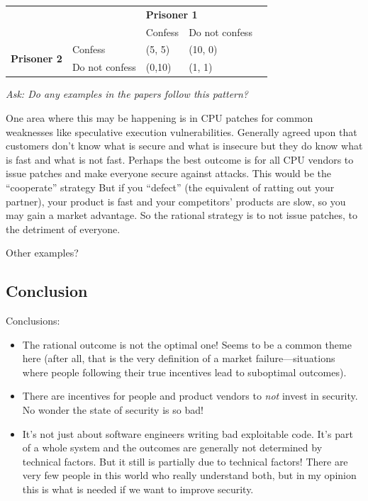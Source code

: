 \documentclass[11pt]{article}
\begin{document}
\begin{table}[]
    \centering
    \begin{tabular}{|ll|ll|l}
    \cline{1-4}
    \multicolumn{2}{|l|}{\multirow{2}{*}{}}                                     & \multicolumn{2}{l|}{\textbf{Prisoner 1}}      &  \\ \cline{3-4}
    \multicolumn{2}{|l|}{}                                                      & \multicolumn{1}{l|}{Confess} & Do not confess &  \\ \cline{1-4}
    \multicolumn{1}{|l|}{\multirow{2}{*}{\textbf{Prisoner 2}}} & Confess        & \multicolumn{1}{l|}{(5, 5)}  & (10, 0)        &  \\ \cline{2-4}
    \multicolumn{1}{|l|}{}                                     & Do not confess & \multicolumn{1}{l|}{(0,10)}  & (1, 1)         &  \\ \cline{1-4}
    \end{tabular}
\end{table}

{\it Ask: Do any examples in the papers follow this pattern?}

One area where this may be happening is in CPU patches for common weaknesses like speculative execution vulnerabilities. 
Generally agreed upon that customers don't know what is secure and what is insecure but they do know what is fast and what is not fast.  Perhaps the best outcome is for all CPU vendors to issue patches and make everyone secure against attacks. This would be the ``cooperate'' strategy
But if you “defect” (the equivalent of ratting out your partner), your product is fast and your competitors’ products are slow, so you may gain a market advantage.
So the rational strategy is to not issue patches, to the detriment of everyone. 

Other examples? 


\subsection{Conclusion}

Conclusions: 
\begin{itemize}
    \item The rational outcome is not the optimal one! Seems to be a common theme here (after all, that is the very definition of a market failure---situations where people following their true incentives lead to suboptimal outcomes).
    \item There are incentives for people and product vendors to {\it not } invest in security. No wonder the state of security is so bad!
    \item It's not just about software engineers writing bad exploitable code. It's part of a whole system and the outcomes are generally not determined by technical factors. But it still is partially due to technical factors! There are very few people in this world who really understand both, but in my opinion this is what is needed if we want to improve security.
\end{itemize}
\end{document}
